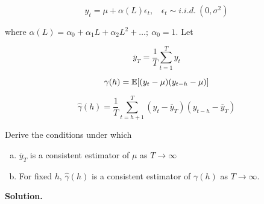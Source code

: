 \[
y_t = \mu + \alpha(L)\epsilon_t, \ \ \ \ \epsilon_t \sim i.i.d. \ (0, \sigma^2)
\]

where \(\alpha(L) = \alpha_0 + \alpha_1 L + \alpha_2 L^2 + \ldots; \ \alpha_0 = 1\). Let 

\[
\overline{y}_T = \frac{1}{T} \sum_{t=1}^T y_t
\]

\[
\gamma(h) = \mathbb{E}[(y_t - \mu)(y_{t-h} - \mu)]
\]

\[
\hat{\gamma}(h) = \frac{1}{T} \sum_{t=h+1}^T(y_t - \overline{y}_T)(y_{t-h} - \overline{y}_T)
\]

Derive the conditions under which

\begin{enumerate}[(a)]

\item \(\overline{y}_T\) is a consistent estimator of \(\mu\) as \(T \to \infty\)

\item For fixed \(h\), \(\hat{\gamma}(h)\) is a consistent estimator of \(\gamma(h)\) as \(T \to \infty\).

\end{enumerate}

\textbf{Solution.}

